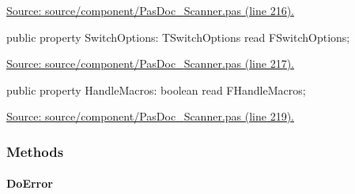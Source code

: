 \documentclass{report}
\newif\ifpdf
\begin{document}
\begin{list}{}
\begin{flushleft}
\ifpdf
\end{flushleft}
\fi


\par  \par
\href{https://github.com/pasdoc/pasdoc/blob/master/source/component/PasDoc_Scanner.pas#L216}{Source: source/component/PasDoc{\_}Scanner.pas (line 216).}\label{PasDoc_Scanner.TScanner-SwitchOptions}
\item[\textbf{SwitchOptions}\hfill]
\ifpdf
\begin{flushleft}
\fi
\begin{ttfamily}
public property SwitchOptions: TSwitchOptions read FSwitchOptions;\end{ttfamily}

\ifpdf
\end{flushleft}
\fi


\par  \par
\href{https://github.com/pasdoc/pasdoc/blob/master/source/component/PasDoc_Scanner.pas#L217}{Source: source/component/PasDoc{\_}Scanner.pas (line 217).}\label{PasDoc_Scanner.TScanner-HandleMacros}
\item[\textbf{HandleMacros}\hfill]
\ifpdf
\begin{flushleft}
\fi
\begin{ttfamily}
public property HandleMacros: boolean read FHandleMacros;\end{ttfamily}

\ifpdf
\end{flushleft}
\fi


\par  \par
\href{https://github.com/pasdoc/pasdoc/blob/master/source/component/PasDoc_Scanner.pas#L219}{Source: source/component/PasDoc{\_}Scanner.pas (line 219).}\end{list}
\subsubsection*{\large{\textbf{Methods}}\normalsize\hspace{1ex}\hfill}
\paragraph*{DoError}\hspace*{\fill}
\end{document}
